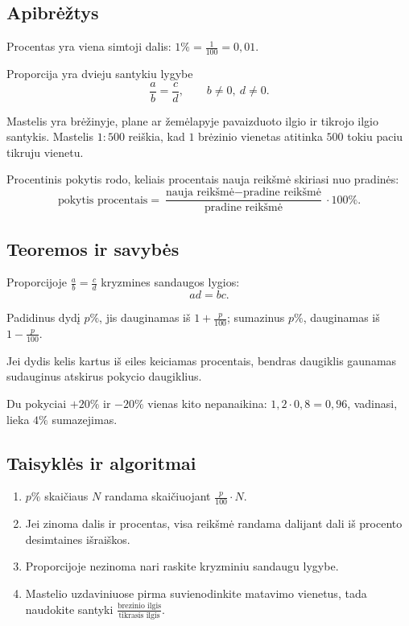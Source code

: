 \subsection{Apibrėžtys}
\begin{apibreztis}
Procentas yra viena simtoji dalis: $1\%=\frac1{100}=0{,}01$.
\end{apibreztis}
\begin{apibreztis}
Proporcija yra dvieju santykiu lygybe
\[
\frac{a}{b}=\frac{c}{d},\qquad b\ne0,\ d\ne0.
\]
\end{apibreztis}
\begin{apibreztis}
Mastelis yra brėžinyje, plane ar žemėlapyje pavaizduoto ilgio ir tikrojo ilgio santykis. Mastelis $1:500$ reiškia, kad $1$ brėzinio vienetas atitinka $500$ tokiu paciu tikruju vienetu.
\end{apibreztis}
\begin{apibreztis}
Procentinis pokytis rodo, keliais procentais nauja reikšmė skiriasi nuo pradinės:
\[
\text{pokytis procentais}=\frac{\text{nauja reikšmė}-\text{pradine reikšmė}}{\text{pradine reikšmė}}\cdot100\%.
\]
\end{apibreztis}

\subsection{Teoremos ir savybės}
\begin{savybe}
Proporcijoje $\frac{a}{b}=\frac{c}{d}$ kryzmines sandaugos lygios:
\[
ad=bc.
\]
\end{savybe}
\begin{savybe}
Padidinus dydį $p\%$, jis dauginamas iš $1+\frac{p}{100}$; sumazinus $p\%$, dauginamas iš $1-\frac{p}{100}$.
\end{savybe}
\begin{savybe}
Jei dydis kelis kartus iš eiles keiciamas procentais, bendras daugiklis gaunamas sudauginus atskirus pokycio daugiklius.
\end{savybe}
\begin{pastaba}
Du pokyciai $+20\%$ ir $-20\%$ vienas kito nepanaikina: $1{,}2\cdot0{,}8=0{,}96$, vadinasi, lieka $4\%$ sumazejimas.
\end{pastaba}

\subsection{Taisyklės ir algoritmai}
\begin{enumerate}[label=\arabic*.]
\item $p\%$ skaičiaus $N$ randama skaičiuojant $\frac{p}{100}\cdot N$.
\item Jei zinoma dalis ir procentas, visa reikšmė randama dalijant dali iš procento desimtaines išraiškos.
\item Proporcijoje nezinoma nari raskite kryzminiu sandaugu lygybe.
\item Mastelio uzdaviniuose pirma suvienodinkite matavimo vienetus, tada naudokite santyki $\frac{\text{brezinio ilgis}}{\text{tikrasis ilgis}}$.
\end{enumerate}
